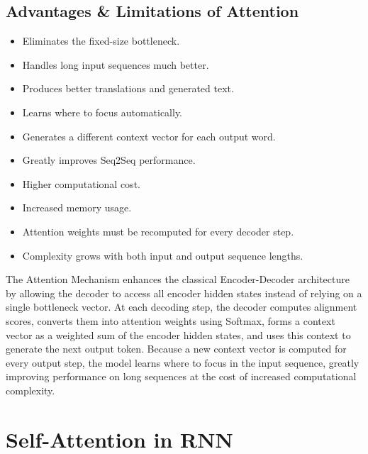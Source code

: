 \subsection{Advantages \& Limitations of Attention}

\begin{advbox}[Advantages]
\begin{itemize}
    \item Eliminates the fixed-size bottleneck.
    \item Handles long input sequences much better.
    \item Produces better translations and generated text.
    \item Learns where to focus automatically.
    \item Generates a different context vector for each output word.
    \item Greatly improves Seq2Seq performance.
\end{itemize}
\end{advbox}

\begin{advbox}[Limitations]
\begin{itemize}
    \item Higher computational cost.
    \item Increased memory usage.
    \item Attention weights must be recomputed for every decoder step.
    \item Complexity grows with both input and output sequence lengths.
\end{itemize}
\end{advbox}

\begin{propertybox}
The Attention Mechanism enhances the classical Encoder-Decoder architecture by allowing the decoder to access all encoder hidden states instead of relying on a single bottleneck vector. At each decoding step, the decoder computes alignment scores, converts them into attention weights using Softmax, forms a context vector as a weighted sum of the encoder hidden states, and uses this context to generate the next output token. Because a new context vector is computed for every output step, the model learns where to focus in the input sequence, greatly improving performance on long sequences at the cost of increased computational complexity.
\end{propertybox}

\section{Self-Attention in RNN}

